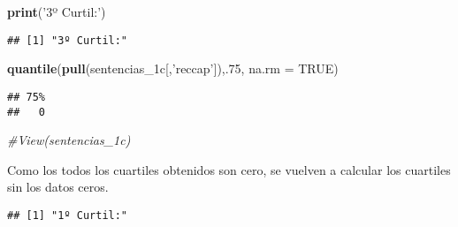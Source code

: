 \documentclass[runningheads,a4paper]{llncs}
\newenvironment{Shaded}{}{}
\newcommand{\KeywordTok}[1]{\textcolor[rgb]{0.00,0.44,0.13}{\textbf{{#1}}}}
\newcommand{\DataTypeTok}[1]{\textcolor[rgb]{0.56,0.13,0.00}{{#1}}}
\newcommand{\DecValTok}[1]{\textcolor[rgb]{0.25,0.63,0.44}{{#1}}}
\newcommand{\StringTok}[1]{\textcolor[rgb]{0.25,0.44,0.63}{{#1}}}
\newcommand{\CommentTok}[1]{\textcolor[rgb]{0.38,0.63,0.69}{\textit{{#1}}}}
\newcommand{\OtherTok}[1]{\textcolor[rgb]{0.00,0.44,0.13}{{#1}}}
\newcommand{\NormalTok}[1]{{#1}}
\newcommand{\OperatorTok}[1]{\textcolor[rgb]{0.40,0.40,0.40}{{#1}}}
\begin{document}
\begin{Shaded}
\begin{Highlighting}[]
\KeywordTok{print}\NormalTok{(}\StringTok{'3º Curtil:'}\NormalTok{)}
\end{Highlighting}
\end{Shaded}

\begin{verbatim}
## [1] "3º Curtil:"
\end{verbatim}

\begin{Shaded}
\begin{Highlighting}[]
\KeywordTok{quantile}\NormalTok{(}\KeywordTok{pull}\NormalTok{(sentencias_1c[,}\StringTok{'reccap'}\NormalTok{]),.}\DecValTok{75}\NormalTok{, }\DataTypeTok{na.rm =} \OtherTok{TRUE}\NormalTok{)}
\end{Highlighting}
\end{Shaded}

\begin{verbatim}
## 75% 
##   0
\end{verbatim}

\begin{Shaded}
\begin{Highlighting}[]
\CommentTok{#View(sentencias_1c)}
\end{Highlighting}
\end{Shaded}

Como los todos los cuartiles obtenidos son cero, se vuelven a calcular
los cuartiles sin los datos ceros.

\begin{Shaded}
\end{Shaded}

\begin{verbatim}
## [1] "1º Curtil:"
\end{verbatim}

\begin{Shaded}
\end{Shaded}
\end{document}
